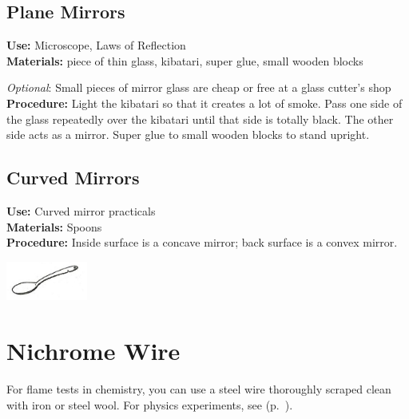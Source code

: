 \begin{multicols}{2}
\subsection{Plane Mirrors}
\vspace{-6pt}
\textbf{Use:} Microscope, Laws of Reflection\\
\textbf{Materials:} piece of thin glass, kibatari, super glue, small wooden blocks 

\emph{Optional}: Small pieces of mirror glass are cheap or free at a glass cutter's shop\\
\textbf{Procedure:} Light the kibatari so that it creates a lot of smoke.  Pass one side of the glass repeatedly over the kibatari until that side is totally black.  The other side acts as a mirror. Super glue to small wooden blocks to stand upright.

\subsection{Curved Mirrors}
\vspace{-6pt}
\textbf{Use:} Curved mirror practicals\\
\textbf{Materials:} Spoons\\
\textbf{Procedure:} Inside surface is a concave mirror; back surface is a convex mirror.
\begin{center}
\includegraphics[width=0.2\textwidth]{./img/source/spoon.jpg}
\end{center}


\section{Nichrome Wire}
\label{sec:nichrome-wire}
For flame tests in chemistry, 
you can use a steel wire thoroughly scraped clean with iron or steel wool. 
For physics experiments, 
see  (p.~\pageref{sec:wire}).


\end{multicols}

